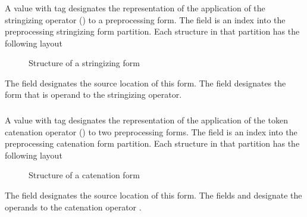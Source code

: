 
\subsubsection{}
\label{sec:ifc:FormSort:Stringize}

A  value with tag  designates
the representation of the application of the stringizing operator (\code{\#}) to
a preprocessing form.
The  field is an index into
the preprocessing stringizing form partition.  Each structure in that partition
has the following layout
%
\begin{figure}[H]
  \centering
  \caption{Structure of a stringizing form}
  \label{fig:ifc-stringize-form}
\end{figure}

The field  designates the source location of this form.  The
field  designates the form that is operand to the 
stringizing operator.


\subsubsection{}
\label{sec:ifc:FormSort:Catenate}

A  value with tag  designates
the representation of the application of the token catenation operator
 (\code{\#\#}) to two preprocessing forms.
The  field is an index into
the preprocessing catenation form partition.  Each structure in that partition
has the following layout
%
\begin{figure}[H]
  \centering
  \caption{Structure of a catenation form}
  \label{fig:ifc-catenate-form}
\end{figure}

The field  designates the source location of this form.  The
fields  and  designate the operands to the 
catenation operator \code{\#\#}.

